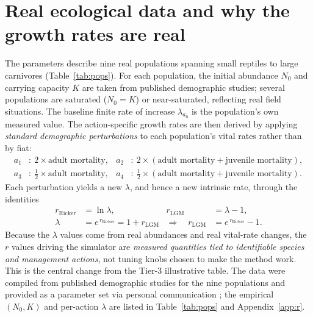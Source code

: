 \documentclass[11pt]{article}
\begin{document}
\section{Real ecological data and why the growth rates are real}
\label{sec:data}
The parameters describe nine real populations spanning small reptiles to large
carnivores (Table~\ref{tab:pops}). For each population, the initial abundance
$N_0$ and carrying capacity $K$ are taken from published demographic studies;
several populations are saturated ($N_0{=}K$) or near-saturated, reflecting real
field situations. The baseline finite rate of increase $\lambda_{a_0}$ is the
population's own measured value. The action-specific growth rates are then derived
by applying \emph{standard demographic perturbations} to each population's vital
rates rather than by fiat:
\begin{equation*}
\begin{aligned}
a_1&:\ 2\times\text{adult mortality},&
a_2&:\ 2\times(\text{adult mortality}+\text{juvenile mortality}),\\
a_3&:\ \tfrac12\times\text{adult mortality},&
a_4&:\ \tfrac12\times(\text{adult mortality}+\text{juvenile mortality}).
\end{aligned}
\end{equation*}
Each perturbation yields a new $\lambda$, and hence a new intrinsic rate, through the
identities
\begin{equation}
\begin{aligned}
r_{\mathrm{Ricker}}&=\ln\lambda,
& r_{\mathrm{LGM}}&=\lambda-1,\\
\lambda&=e^{\,r_{\mathrm{Ricker}}}=1+r_{\mathrm{LGM}}
&\Rightarrow\quad
r_{\mathrm{LGM}}&=e^{\,r_{\mathrm{Ricker}}}-1 .
\end{aligned}
\label{eq:conv}
\end{equation}
Because the $\lambda$ values come from real abundances and real vital-rate changes,
the $r$ values driving the simulator are \emph{measured quantities tied to identifiable
species and management actions}, not tuning knobs chosen to make the method work.
This is the central change from the Tier-3 illustrative table. The data were
compiled from published demographic studies for the nine populations and provided
as a parameter set via personal communication \cite{realdata2026}; the empirical
$(N_0,K)$ and per-action $\lambda$ are listed in Table~\ref{tab:pops} and
Appendix~\ref{app:r}.
\end{document}
